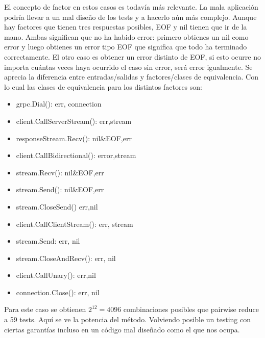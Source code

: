 El concepto de factor en estos casos es todavía más relevante.
La mala aplicación podría llevar a un mal diseño de los tests y a hacerlo aún más complejo.
Aunque hay factores que tienen tres respuestas posibles, EOF y nil tienen que ir de la mano.
Ambas significan que no ha habido error: primero obtienes un nil como error y luego obtienes un error tipo EOF que significa que todo ha terminado correctamente.
El otro caso es obtener un error distinto de EOF, si esto ocurre no importa cuántas veces haya ocurrido el caso sin error, será error igualmente.
Se aprecia la diferencia entre entradas/salidas y factores/clases de equivalencia.
Con lo cual las clases de equivalencia para los distintos factores son:

\begin{itemize}
    \item grpc.Dial(): err, connection
    \item client.CallServerStream(): err,stream
    \item responseStream.Recv(): nil\&EOF,err
    \item client.CallBidirectional(): error,stream
    \item stream.Recv(): nil\&EOF,err
    \item stream.Send(): nil\&EOF,err
    \item stream.CloseSend() err,nil
    \item client.CallClientStream(): err, stream
    \item stream.Send: err, nil
    \item stream.CloseAndRecv(): err, nil
    \item client.CallUnary(): err,nil
    \item connection.Close(): err, nil
\end{itemize}

Para este caso se obtienen $ 2^{12} = 4096 $ combinaciones posibles que pairwise reduce a 59 tests.
Aquí se ve la potencia del método.
Volviendo posible un testing con ciertas garantías incluso en un código mal diseñado como el que nos ocupa.
